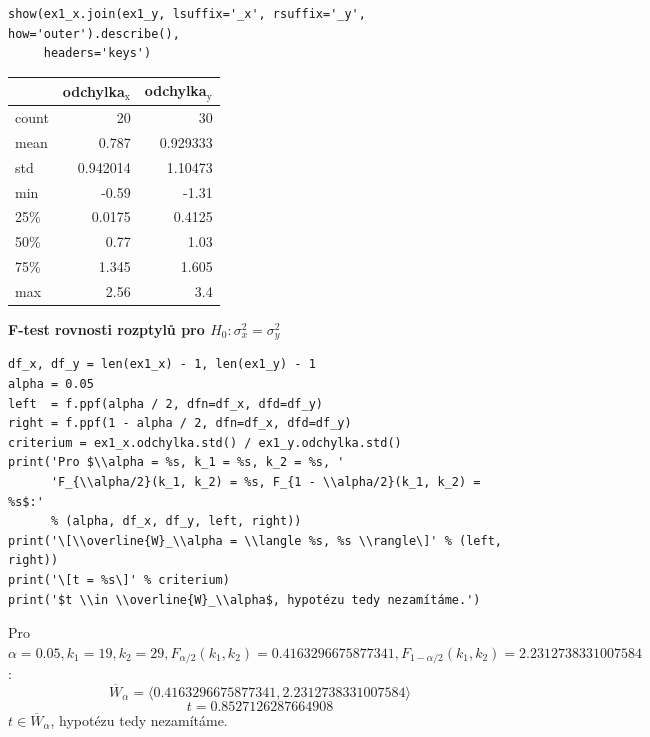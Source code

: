\documentclass[11pt,titlepage]{article}
\begin{document}
\begin{listing}[htbp]
\begin{verbatim}
show(ex1_x.join(ex1_y, lsuffix='_x', rsuffix='_y', how='outer').describe(),
     headers='keys')
\end{verbatim}
\end{listing}

\begin{center}
\begin{tabular}{lrr}
 & odchylka\(_{\text{x}}\) & odchylka\(_{\text{y}}\)\\
\hline
count & 20 & 30\\
mean & 0.787 & 0.929333\\
std & 0.942014 & 1.10473\\
min & -0.59 & -1.31\\
25\% & 0.0175 & 0.4125\\
50\% & 0.77 & 1.03\\
75\% & 1.345 & 1.605\\
max & 2.56 & 3.4\\
\end{tabular}
\end{center}

\newpage

\textbf{F-test rovnosti rozptylů pro \(H_0: \sigma^2_x = \sigma^2_y\)}
\begin{listing}[htbp]
\begin{verbatim}
df_x, df_y = len(ex1_x) - 1, len(ex1_y) - 1
alpha = 0.05
left  = f.ppf(alpha / 2, dfn=df_x, dfd=df_y)
right = f.ppf(1 - alpha / 2, dfn=df_x, dfd=df_y)
criterium = ex1_x.odchylka.std() / ex1_y.odchylka.std()
print('Pro $\\alpha = %s, k_1 = %s, k_2 = %s, '
      'F_{\\alpha/2}(k_1, k_2) = %s, F_{1 - \\alpha/2}(k_1, k_2) = %s$:'
      % (alpha, df_x, df_y, left, right))
print('\[\\overline{W}_\\alpha = \\langle %s, %s \\rangle\]' % (left, right))
print('\[t = %s\]' % criterium)
print('$t \\in \\overline{W}_\\alpha$, hypotézu tedy nezamítáme.')
\end{verbatim}
\end{listing}

Pro \(\alpha = 0.05, k_1 = 19, k_2 = 29, F_{\alpha/2}(k_1, k_2) = 0.4163296675877341, F_{1 - \alpha/2}(k_1, k_2) = 2.2312738331007584\):
\[\overline{W}_\alpha = \langle 0.4163296675877341, 2.2312738331007584 \rangle\]
\[t = 0.8527126287664908\]
\(t \in \overline{W}_\alpha\), hypotézu tedy nezamítáme.
\end{document}
